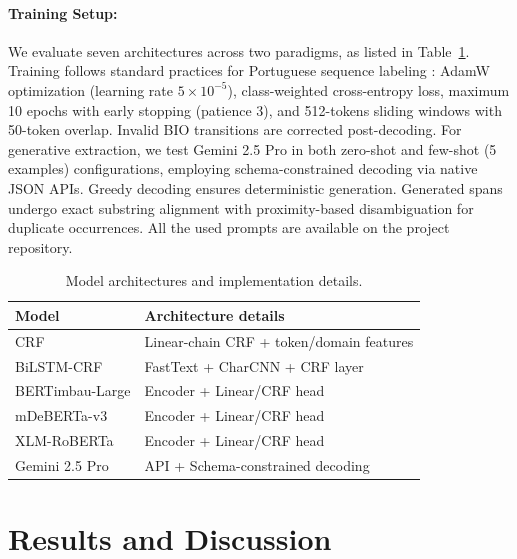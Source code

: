 \documentclass[11pt]{article}
\begin{document}
\paragraph{Training Setup:} We evaluate seven architectures across two paradigms, as listed in Table~\ref{tab:model_details}. Training follows standard practices for Portuguese sequence labeling \cite{Bert-CRF-Souza}: AdamW optimization (learning rate \(5 \times 10^{-5}\)), class-weighted cross-entropy loss, maximum 10 epochs with early stopping (patience 3), and 512-tokens sliding windows with 50-token overlap. Invalid BIO transitions are corrected post-decoding.
 For generative extraction, we test Gemini 2.5 Pro \cite{gemini25} %
in both zero-shot and few-shot (5 examples) configurations, employing schema-constrained decoding via native JSON APIs. %
Greedy decoding ensures deterministic generation. Generated spans undergo exact substring alignment with proximity-based disambiguation for duplicate occurrences. All the used prompts are available on the project repository. 

\begin{table}[ht!]
\caption{Model architectures and implementation details.}
\label{tab:model_details}
\centering
\small
\setlength{\tabcolsep}{3pt} %
\begin{tabularx}{\columnwidth}{l >{\raggedright\arraybackslash}X}
\toprule
\textbf{Model} & \textbf{Architecture details} \\
\midrule
CRF & Linear-chain CRF + token/domain features \cite{Lafferty2001} \\
BiLSTM-CRF & FastText + CharCNN + CRF layer \cite{huang2015bidirectionallstmcrf} \\
BERTimbau-Large & Encoder + Linear/CRF head \cite{souza2020bertimbau} \\
mDeBERTa-v3 & Encoder + Linear/CRF head \cite{2021debertav3} \\
XLM-RoBERTa & Encoder + Linear/CRF head \cite{2019XLM-Roberta} \\
\midrule
Gemini 2.5 Pro & API + Schema-constrained decoding \cite{gemini25} \\
\bottomrule
\end{tabularx}
\end{table}

\section{Results and Discussion}
\label{sec:results}
\end{document}
